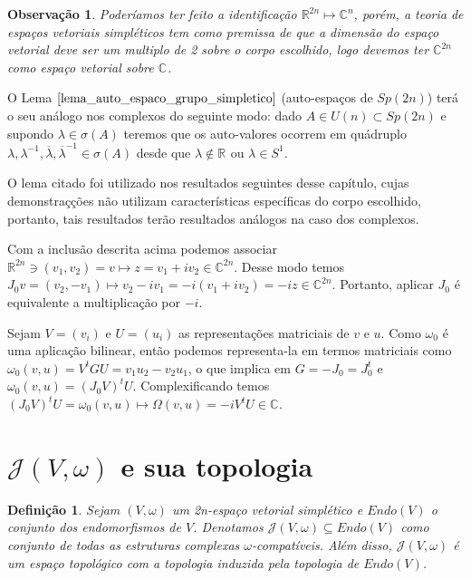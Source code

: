 \documentclass[12pt]{book}
\newtheorem{definicao}[teorema]{Definição}
\newtheorem{observacao}[teorema]{Observação}
\newcommand{\circulo}{S^{1}}
\newcommand{\complexo}[1]{\mathbb{C}^{#1}}
\newcommand{\estruturacomplexa}{J_{0}}
\newcommand{\estruturascomplexaspadrao}{\mathcal{J}(V, \omega)}
\newcommand{\formaSimpleticaPadrao}[2]{\omega_{0}(#1, #2)}
\newcommand{\gruposimpletico}[1]{Sp(#1)}
\newcommand{\matrizunitaria}[1]{U(#1)}
\newcommand{\real}[1]{\mathbb{R}^{#1}}
\newcommand{\reta}{\real{}}
\begin{document}
		\begin{observacao}
			Poderíamos ter feito a identificação $\real{2n} \mapsto \complexo{n}$, porém, a teoria de espaços vetoriais simpléticos tem como premissa de que a dimensão do espaço vetorial deve ser um multiplo de 2 sobre o corpo escolhido, logo devemos ter $\complexo{2n}$ como espaço vetorial sobre $\complexo{}$.
		\end{observacao}
		
		O Lema $\ref{lema_auto_espaco_grupo_simpletico}$ (auto-espaços de $\gruposimpletico{2n}$) terá o seu análogo nos complexos do seguinte modo: dado $A \in \matrizunitaria{n}\subset \gruposimpletico{2n}$ e supondo $\lambda \in \sigma(A)$ teremos que os auto-valores ocorrem em quádruplo $\lambda, \lambda^{-1}, \overline{\lambda}, \overline{\lambda}^{-1} \in \sigma(A)$ desde que $\lambda \notin \reta$ ou $\lambda \in \circulo$.
	
		O lema citado foi utilizado nos resultados seguintes desse capítulo, cujas demonstraçções não utilizam características específicas do corpo escolhido, portanto, tais resultados terão resultados análogos na caso dos complexos.
		
		Com a inclusão descrita acima podemos associar $\real{2n}\ni (v_{1}, v_{2}) = v \mapsto z = v_{1}+iv_{2} \in \complexo{2n}$. Desse modo temos $\estruturacomplexa v = (v_{2}, -v_{1}) \mapsto v_{2}-iv_{1} = -i(v_{1}+iv_{2}) = -iz \in \complexo{2n}$. Portanto, aplicar $\estruturacomplexa$ é equivalente a multiplicação por $-i$. 
		
		Sejam $V=(v_{i})$ e $U = (u_{i})$ as representações matriciais de $v$ e $u$. Como $\omega_{0}$ é uma aplicação bilinear, então podemos representa-la em termos matriciais como  $\formaSimpleticaPadrao{v}{u} = V^{t}GU=v_{1}u_{2}-v_{2}u_{1}$, o que implica em $G = -\estruturacomplexa = \estruturacomplexa^{t}$ e $\formaSimpleticaPadrao{v}{u} = (\estruturacomplexa V)^{t}U$. Complexificando temos $(\estruturacomplexa V)^{t}U = \formaSimpleticaPadrao{v}{u}  \mapsto \Omega(v,u) = -iV^{t}U \in \complexo{}$.
		
	\section{$\estruturascomplexaspadrao$ e sua topologia}
	
	\begin{definicao} \label{definicao_conjunto_estrutura_complexa}
		Sejam $(V,\omega)$ um 2n-espaço vetorial simplético e $Endo(V)$ o conjunto dos endomorfismos de $V$. Denotamos $\estruturascomplexaspadrao \subseteq Endo(V)$ como conjunto de todas as estruturas complexas $\omega$-compatíveis. Além disso, $\estruturascomplexaspadrao$ é um espaço topológico com a topologia induzida pela topologia de $Endo(V)$.
	\end{definicao}
	
\end{document}
